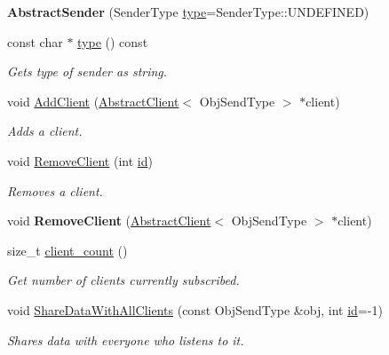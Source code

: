 \begin{DoxyCompactItemize}
\item 
\mbox{\label{classdepth__clustering_1_1AbstractSender_ab04a328c2cc29a97bc3bba2b696c8786}} 
{\bfseries Abstract\+Sender} (Sender\+Type \hyperlink{classdepth__clustering_1_1AbstractSender_a6120bda97c12587db40f34ed73b45475}{type}=Sender\+Type\+::\+U\+N\+D\+E\+F\+I\+N\+ED)
\item 
const char $\ast$ \hyperlink{classdepth__clustering_1_1AbstractSender_a6120bda97c12587db40f34ed73b45475}{type} () const
\begin{DoxyCompactList}\small\item\em Gets type of sender as string. \end{DoxyCompactList}\item 
void \hyperlink{classdepth__clustering_1_1AbstractSender_aca33c29cca1916fb0a3edd9024a49b51}{Add\+Client} (\hyperlink{classdepth__clustering_1_1AbstractClient}{Abstract\+Client}$<$ Obj\+Send\+Type $>$ $\ast$client)
\begin{DoxyCompactList}\small\item\em Adds a client. \end{DoxyCompactList}\item 
void \hyperlink{classdepth__clustering_1_1AbstractSender_a0c33c98abe8fa71a86f02af95b1c71c1}{Remove\+Client} (int \hyperlink{classdepth__clustering_1_1Identifiable_a50f8b49ce7f7f0d9d02f31f74e0fc9e0}{id})
\begin{DoxyCompactList}\small\item\em Removes a client. \end{DoxyCompactList}\item 
\mbox{\label{classdepth__clustering_1_1AbstractSender_ab331127e3e36b15413e1eecf55b5b284}} 
void {\bfseries Remove\+Client} (\hyperlink{classdepth__clustering_1_1AbstractClient}{Abstract\+Client}$<$ Obj\+Send\+Type $>$ $\ast$client)
\item 
size\+\_\+t \hyperlink{classdepth__clustering_1_1AbstractSender_a957331eb41f11208bbe6174895c11bf2}{client\+\_\+count} ()
\begin{DoxyCompactList}\small\item\em Get number of clients currently subscribed. \end{DoxyCompactList}\item 
void \hyperlink{classdepth__clustering_1_1AbstractSender_a147752e5ab7ca15da9c8d8e60575390b}{Share\+Data\+With\+All\+Clients} (const Obj\+Send\+Type \&obj, int \hyperlink{classdepth__clustering_1_1Identifiable_a50f8b49ce7f7f0d9d02f31f74e0fc9e0}{id}=-\/1)
\begin{DoxyCompactList}\small\item\em Shares data with everyone who listens to it. \end{DoxyCompactList}\end{DoxyCompactItemize}
